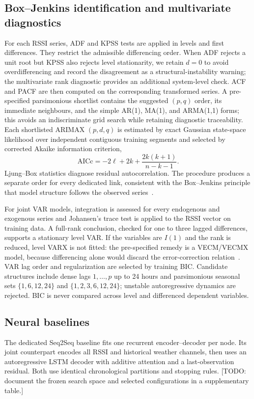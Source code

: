 \documentclass[preprint,12pt]{elsarticle}
\begin{document}
\subsection{Box--Jenkins identification and multivariate diagnostics}
For each RSSI series, ADF and KPSS tests are applied in levels and first differences.
They restrict the admissible differencing order. When ADF rejects a unit root but KPSS
also rejects level stationarity, we retain $d=0$ to avoid overdifferencing and record
the disagreement as a structural-instability warning; the multivariate rank diagnostic
provides an additional system-level check. ACF and PACF are then computed
on the corresponding transformed series. A pre-specified parsimonious shortlist
contains the suggested $(p,q)$ order, its immediate neighbours, and the simple AR(1),
MA(1), and ARMA(1,1) forms; this avoids an indiscriminate grid search while retaining
diagnostic traceability. Each shortlisted ARIMAX $(p,d,q)$ is estimated by exact Gaussian state-space
likelihood over independent contiguous training segments and selected by corrected
Akaike information criterion,
\begin{equation}
 \mathrm{AICc}= -2\ell+2k+\frac{2k(k+1)}{n-k-1}.
\end{equation}
Ljung--Box statistics diagnose residual autocorrelation. The procedure produces a
separate order for every dedicated link, consistent with the Box--Jenkins principle
that model structure follows the observed series~\cite{box2015time,hyndman2008automatic}.

For joint VAR models, integration is assessed for every endogenous and exogenous
series and Johansen's trace test is applied to the RSSI vector on training data. A
full-rank conclusion, checked for one to three lagged differences, supports a
stationary level VAR. If the variables are $I(1)$ and the rank is reduced, level
VARX is not fitted: the pre-specified remedy is a
VECM/VECMX model, because differencing alone would discard the error-correction
relation~\cite{johansen1991estimation,lutkepohl2005new}. VAR lag order and regularization
are selected by training BIC. Candidate structures include dense lags $1,\ldots,p$
up to 24 hours and parsimonious seasonal sets $\{1,6,12,24\}$ and
$\{1,2,3,6,12,24\}$; unstable autoregressive dynamics are rejected. BIC is never
compared across level and differenced dependent variables.

\subsection{Neural baselines}
The dedicated Seq2Seq baseline fits one recurrent encoder--decoder per node. Its joint
counterpart encodes all RSSI and historical weather channels, then uses an
autoregressive LSTM decoder with additive attention and a last-observation residual.
Both use identical chronological partitions and stopping rules. [TODO: document the
frozen search space and selected configurations in a supplementary table.]
\end{document}
